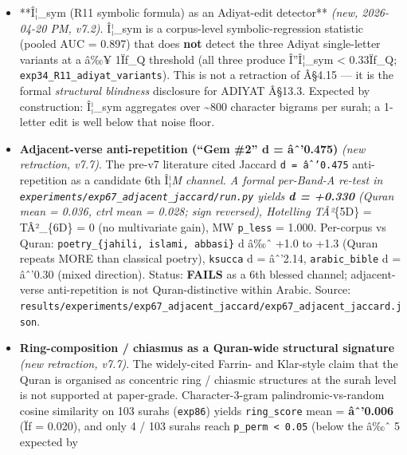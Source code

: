 \documentclass[
]{article}
\begin{document}
\begin{itemize}
{  canonical ordering (BH \texttt{p\_adj\ â‰¤\ 10â»Â³}); path minimality
  is a shared Abrahamic-scripture property, not a Quran-unique one.} The
  Iliad serves as a valid negative control (z = +0.34, fails BH, as
  expected for narrative-chronological text). Full table in Â§4.16;
  source:
  \texttt{results/experiments/exp35\_R3\_cross\_scripture\_redo/exp35\_R3\_cross\_scripture\_redo.json}.
\item
  **Î¦\_sym (R11 symbolic formula) as an Adiyat-edit detector**
  \emph{(new, 2026-04-20 PM, v7.2)}. Î¦\_sym is a corpus-level
  symbolic-regression statistic (pooled AUC = 0.897) that does
  \textbf{not} detect the three Adiyat single-letter variants at a â‰¥
  1Ïƒ\_Q threshold (all three produce Î''Î¦\_sym \textless{} 0.33Ïƒ\_Q;
  \texttt{exp34\_R11\_adiyat\_variants}). This is not a retraction of
  Â§4.15 --- it is the formal \emph{structural blindness} disclosure for
  ADIYAT Â§13.3. Expected by construction: Î¦\_sym aggregates over
  \textasciitilde800 character bigrams per surah; a 1-letter edit is
  well below that noise floor.
\item
  \textbf{Adjacent-verse anti-repetition (``Gem \#2'' d = âˆ'0.475)}
  \emph{(new retraction, v7.7)}. The pre-v7 literature cited Jaccard
  \texttt{d\ =\ âˆ’0.475} anti-repetition as a candidate 6th Î¦\emph{M
  channel. A formal per-Band-A re-test in
  \texttt{experiments/exp67\_adjacent\_jaccard/run.py} yields \textbf{d
  = +0.330} (Quran mean = 0.036, ctrl mean = 0.028; sign reversed),
  Hotelling TÂ²}\{5D\} = TÂ²\_\{6D\} = 0 (no multivariate gain), MW
  \texttt{p\_less} = 1.000. Per-corpus vs Quran:
  \texttt{poetry\_\{jahili,\ islami,\ abbasi\}} d â‰ˆ +1.0 to +1.3
  (Quran repeats MORE than classical poetry), \texttt{ksucca} d =
  âˆ'2.14, \texttt{arabic\_bible} d = âˆ'0.30 (mixed direction). Status:
  \textbf{FAILS} as a 6th blessed channel; adjacent-verse
  anti-repetition is not Quran-distinctive within Arabic. Source:
  \texttt{results/experiments/exp67\_adjacent\_jaccard/exp67\_adjacent\_jaccard.json}.
\item
  \textbf{Ring-composition / chiasmus as a Quran-wide structural
  signature} \emph{(new retraction, v7.7)}. The widely-cited Farrin- and
  Klar-style claim that the Quran is organised as concentric ring /
  chiasmic structures at the surah level is not supported at
  paper-grade. Character-3-gram palindromic-vs-random cosine similarity
  on 103 surahs (\texttt{exp86}) yields \texttt{ring\_score} mean =
  \textbf{âˆ'0.006} (Ïƒ = 0.020), and only 4 / 103 surahs reach
  \texttt{p\_perm\ \textless{}\ 0.05} (below the â‰ˆ 5 expected by

\end{itemize}
\end{document}
